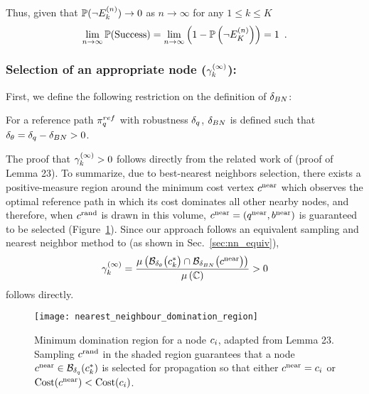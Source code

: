 Thus, given that $\mathbb{P}(\neg E^{(n)}_k) \rightarrow 0$ as $n \rightarrow \infty$ for any $1 \leq k \leq K$
\begin{equation}
    \lim_{n \rightarrow \infty} \mathbb{P}(\textrm{Success}) = \lim_{n \rightarrow \infty} \left( 1 - \mathbb{P}\left( \neg E^{(n)}_K \right) \right) = 1 \enspace.
\end{equation}



\subsubsection{Selection of an appropriate node ($\gamma_k^{(\infty)}$):}
\label{sec:select}

First, we define the following restriction on the definition of $\delta_{BN}$: 

\begin{definition}
\label{prop:bestnear_requirement}
    For a reference path $\pi_{q}^{ref}$ with robustness $\delta_q$, $\delta_{BN}$ is defined such that $\delta_\theta = \delta_q - \delta_{BN} > 0$.
\end{definition}

The proof that $\gamma_k^{(\infty)} > 0$ follows directly from the related work of \cite{LiAOKP2016} (proof of Lemma 23).  To summarize, due to best-nearest neighbors selection, there exists a positive-measure region around the minimum cost vertex $c^\textrm{near}$ which observes the optimal reference path in which its cost dominates all other nearby nodes, and therefore, when $c^\textrm{rand}$ is drawn in this volume, $c^\textrm{near} = (q^\textrm{near}, b^\textrm{near})$ is guaranteed to be selected (Figure~\ref{fig:Yanbo_lemma_23_figure}).  Since our approach follows an equivalent sampling and nearest neighbor method to \cite{LiAOKP2016} (as shown in Sec.~\ref{sec:nn_equiv}), 
\begin{equation}
    \gamma_k^{(\infty)} = \frac{\mu\left( \mathcal{B}_{\delta_\theta}\big( c_k^* \big) \cap \mathcal{B}_{\delta_{BN}}\big( c^\textrm{near} \big) \right)}{\mu\left( \mathbb{C} \right)} > 0
\end{equation}
follows directly.

\begin{figure}[t]
    \centering
    \texttt{[image: nearest\_neighbour\_domination\_region]}
    \caption{Minimum domination region for a node $c_i$, adapted from \cite{LiAOKP2016} Lemma 23. Sampling $c^\textrm{rand}$ in the shaded region guarantees that a node $c^\textrm{near} \in \mathcal{B}_{\delta_q}(c_k^*)$ is selected for propagation so that either $c^\textrm{near} = c_i$ or $\textrm{Cost}(c^\textrm{near}) < \textrm{Cost}(c_i)$.}
    \label{fig:Yanbo_lemma_23_figure}
\end{figure}


